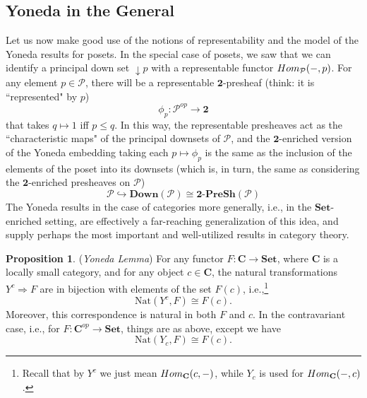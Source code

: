 \documentclass[a4paper]{book}
\theoremstyle{definition}
\theoremstyle{definition}
\theoremstyle{definition}
\newtheorem{proposition}{Proposition}[section]
\theoremstyle{theorem}
\theoremstyle{definition}
\begin{document}
\subsection{Yoneda in the General}
Let us now make good use of the notions of representability and the model of the Yoneda results for posets. In the special case of posets, we saw that we can identify a principal down set $\downarrow p$ with a representable functor $Hom_{\mathcal{P}}(\--, p)$. For any element $p \in \mathcal{P}$, there will be a representable $\textbf{2}$-presheaf (think: it is ``represented" by $p$) 
\begin{equation*}
\phi_p: \mathcal{P}^{op} \rightarrow \textbf{2} 
\end{equation*}
that takes $q \mapsto 1$ iff $p \leq q$. In this way, the representable presheaves act as the ``characteristic maps" of the principal downsets of $\mathcal{P}$, and the $\textbf{2}$-enriched version of the Yoneda embedding taking each $p \mapsto \phi_p$ is the same as the inclusion of the elements of the poset into its downsets (which is, in turn, the same as considering the $\textbf{2}$-enriched presheaves on $\mathcal{P}$) 
\begin{equation*}
\mathcal{P} \hookrightarrow \textbf{Down}(\mathcal{P}) \cong \textbf{2-}\textbf{PreSh}(\mathcal{P})
\end{equation*} \noindent 
The Yoneda results in the case of categories more generally, i.e., in the $\textbf{Set}$-enriched setting, are effectively a far-reaching generalization of this idea, and supply perhaps the most important and well-utilized results in category theory.   
\begin{proposition}
	(\textit{Yoneda Lemma})  For any functor $F: \textbf{C} \rightarrow \textbf{Set}$, where $\textbf{C}$ is a locally small category, and for any object $c \in \textbf{C}$, the natural transformations $Y^c \Rightarrow F$ are in bijection with elements of the set $F(c)$, i.e.,\footnote{Recall that by $Y^c$ we just mean $Hom_{\textbf{C}}(c,\--)$, while $Y_c$ is used for $Hom_{\textbf{C}}(\--, c)$.}  
	\begin{equation}
	\text{Nat}(Y^c, F) \cong F(c).
	\end{equation} 
	Moreover, this correspondence is natural in both $F$ and $c$. In the contravariant case, i.e., for $F: \textbf{C}^{op} \rightarrow \textbf{Set}$, things are as above, except we have 
	\begin{equation}
	\text{Nat}(Y_c, F) \cong F(c).
	\end{equation} 
\end{proposition} 
\end{document}
